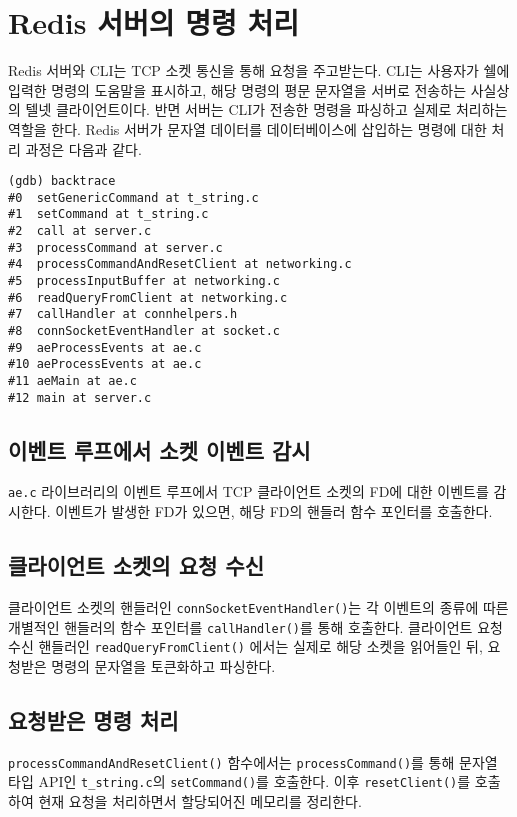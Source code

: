 \documentclass[11pt]{article}
\begin{document}
\section{Redis 서버의 명령 처리}
Redis 서버와 CLI는 TCP 소켓 통신을 통해 요청을 주고받는다. CLI는 사용자가 쉘에
입력한 명령의 도움말을 표시하고, 해당 명령의 평문 문자열을 서버로 전송하는 사실상의
텔넷 클라이언트이다. 반면 서버는 CLI가 전송한 명령을 파싱하고 실제로 처리하는 역할을
한다. Redis 서버가 문자열 데이터를 데이터베이스에 삽입하는 명령에 대한 처리 과정은
다음과 같다.

\vspace{.2in}
\begin{lstlisting}[style=gdb]
(gdb) backtrace
#0  setGenericCommand at t_string.c
#1  setCommand at t_string.c
#2  call at server.c
#3  processCommand at server.c
#4  processCommandAndResetClient at networking.c
#5  processInputBuffer at networking.c
#6  readQueryFromClient at networking.c
#7  callHandler at connhelpers.h
#8  connSocketEventHandler at socket.c
#9  aeProcessEvents at ae.c
#10 aeProcessEvents at ae.c
#11 aeMain at ae.c
#12 main at server.c
\end{lstlisting}
\vspace{.2in}

\subsection{이벤트 루프에서 소켓 이벤트 감시}
\texttt{ae.c} 라이브러리의 이벤트 루프에서 TCP 클라이언트 소켓의 FD에 대한 이벤트를
감시한다. 이벤트가 발생한 FD가 있으면, 해당 FD의 핸들러 함수 포인터를 호출한다.

\subsection{클라이언트 소켓의 요청 수신}
클라이언트 소켓의 핸들러인 \texttt{connSocketEventHandler()}는 각 이벤트의 종류에
따른 개별적인 핸들러의 함수 포인터를 \texttt{callHandler()}를 통해 호출한다.
클라이언트 요청 수신 핸들러인 \texttt{readQueryFromClient()} 에서는 실제로 해당
소켓을 읽어들인 뒤, 요청받은 명령의 문자열을 토큰화하고 파싱한다.

\subsection{요청받은 명령 처리}
\texttt{processCommandAndResetClient()} 함수에서는
\texttt{processCommand()}를 통해 문자열 타입 API인 \texttt{t\_string.c}의
\texttt{setCommand()}를 호출한다. 이후 \texttt{resetClient()}를 호출하여 현재
요청을 처리하면서 할당되어진 메모리를 정리한다.
\end{document}
